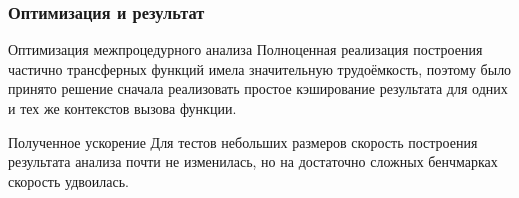 \documentclass[utf8,russian]{beamer}
\begin{document}

\begin{frame}
\frametitle{Оптимизация и результат}

\begin{block}{Оптимизация межпроцедурного анализа}
Полноценная реализация построения частично трансферных функций имела значительную трудоёмкость, поэтому было принято решение сначала реализовать простое кэширование результата для одних и тех же контекстов вызова функции.
\end{block}

\begin{block}{Полученное ускорение}
Для тестов небольших размеров скорость построения результата анализа почти не изменилась, но на достаточно сложных бенчмарках скорость удвоилась.
\end{block}

\end{frame}

\end{document}
